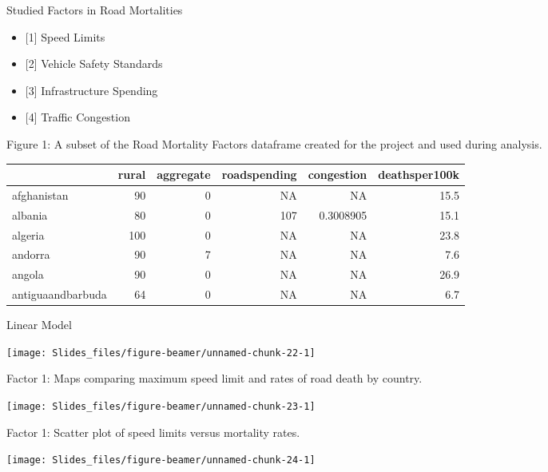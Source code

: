 \documentclass[ignorenonframetext,]{beamer}
\providecommand{\tightlist}{%
  \setlength{\itemsep}{0pt}\setlength{\parskip}{0pt}}
\begin{document}
\begin{frame}{Studied Factors in Road Mortalities}

\begin{itemize}
\tightlist
\item
  {[}1{]} Speed Limits
\item
  {[}2{]} Vehicle Safety Standards
\item
  {[}3{]} Infrastructure Spending
\item
  {[}4{]} Traffic Congestion
\end{itemize}

\end{frame}

\begin{frame}{Figure 1: A subset of the Road Mortality Factors dataframe
created for the project and used during analysis.}

\begin{longtable}[]{@{}lrrrrr@{}}
\toprule
& rural & aggregate & roadspending & congestion &
deathsper100k\tabularnewline
\midrule
\endhead
afghanistan & 90 & 0 & NA & NA & 15.5\tabularnewline
albania & 80 & 0 & 107 & 0.3008905 & 15.1\tabularnewline
algeria & 100 & 0 & NA & NA & 23.8\tabularnewline
andorra & 90 & 7 & NA & NA & 7.6\tabularnewline
angola & 90 & 0 & NA & NA & 26.9\tabularnewline
antiguaandbarbuda & 64 & 0 & NA & NA & 6.7\tabularnewline
\bottomrule
\end{longtable}

\end{frame}

\begin{frame}{Linear Model}

\begin{center}\texttt{[image: Slides\_files/figure-beamer/unnamed-chunk-22-1]} \end{center}

\end{frame}

\begin{frame}{Factor 1: Maps comparing maximum speed limit and rates of
road death by country.}

\begin{center}\texttt{[image: Slides\_files/figure-beamer/unnamed-chunk-23-1]} \end{center}

\end{frame}

\begin{frame}{Factor 1: Scatter plot of speed limits versus mortality
rates.}

\begin{center}\texttt{[image: Slides\_files/figure-beamer/unnamed-chunk-24-1]} \end{center}

\end{frame}
\end{document}
